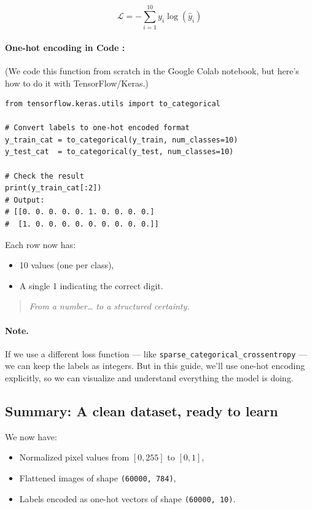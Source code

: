 \documentclass[11pt]{article}
\begin{document}
\[
\mathcal{L} = -\sum_{i=1}^{10} y_i \log(\hat{y}_i)
\]

\bigskip

\paragraph{One-hot encoding in Code :}

(We code this function from scratch in the Google Colab notebook, but here’s how to do it with TensorFlow/Keras.)

\begin{verbatim}
from tensorflow.keras.utils import to_categorical

# Convert labels to one-hot encoded format
y_train_cat = to_categorical(y_train, num_classes=10)
y_test_cat  = to_categorical(y_test, num_classes=10)

# Check the result
print(y_train_cat[:2])
# Output:
# [[0. 0. 0. 0. 0. 1. 0. 0. 0. 0.]
#  [1. 0. 0. 0. 0. 0. 0. 0. 0. 0.]]
\end{verbatim}

Each row now has:
\begin{itemize}
    \item 10 values (one per class),
    \item A single 1 indicating the correct digit.
\end{itemize}

\begin{quote}
\textit{From a number… to a structured certainty.}
\end{quote}

\paragraph{Note.}  
If we use a different loss function — like \texttt{sparse\_categorical\_crossentropy} — we can keep the labels as integers. But in this guide, we’ll use one-hot encoding explicitly, so we can visualize and understand everything the model is doing.

\bigskip

\subsection*{Summary: A clean dataset, ready to learn}

We now have:
\begin{itemize}
    \item Normalized pixel values from $[0, 255]$ to $[0, 1]$,
    \item Flattened images of shape \texttt{(60000, 784)},
    \item Labels encoded as one-hot vectors of shape \texttt{(60000, 10)}.
\end{itemize}
\end{document}
